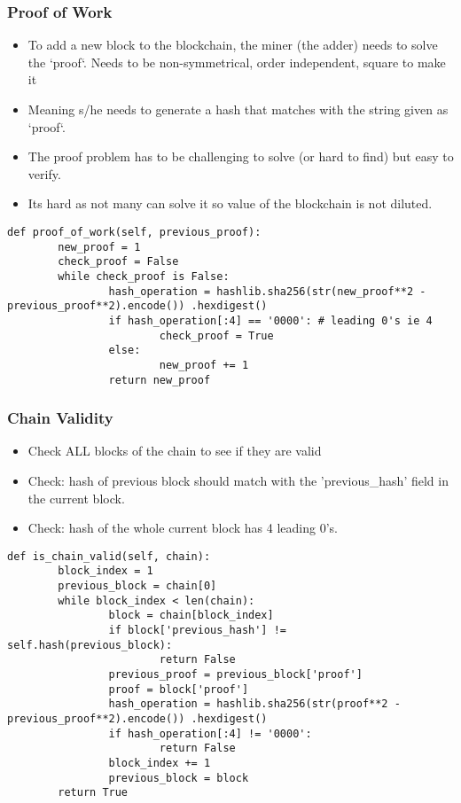 \begin{frame}[fragile]\frametitle{Proof of Work}
\begin{itemize}
\item To add a new block to the blockchain, the miner (the adder) needs to solve the `proof`. Needs to be non-symmetrical, order independent, square to make it 
\item Meaning s/he needs to generate a hash that matches with the string given as `proof`.
\item The proof problem has to be challenging to solve (or hard to find)  but easy to verify.
\item Its hard as not many can solve it so value of the blockchain is not diluted.

\end{itemize}

\begin{lstlisting}
def proof_of_work(self, previous_proof):
		new_proof = 1
		check_proof = False
		while check_proof is False:
				hash_operation = hashlib.sha256(str(new_proof**2 - previous_proof**2).encode()) .hexdigest()
				if hash_operation[:4] == '0000': # leading 0's ie 4
						check_proof = True
				else:
						new_proof += 1
				return new_proof
\end{lstlisting}
\end{frame}

\begin{frame}[fragile]\frametitle{Chain Validity}
\begin{itemize}
\item Check ALL blocks of the chain to see if they are valid
\item Check: hash of previous block should match with the 'previous\_hash' field in the current block.
\item Check: hash of the whole current block has 4 leading 0's.
\end{itemize}

\begin{lstlisting}
def is_chain_valid(self, chain):
		block_index = 1
		previous_block = chain[0]
		while block_index < len(chain):
				block = chain[block_index]
				if block['previous_hash'] != self.hash(previous_block):
						return False
				previous_proof = previous_block['proof']
				proof = block['proof']
				hash_operation = hashlib.sha256(str(proof**2 - previous_proof**2).encode()) .hexdigest()
				if hash_operation[:4] != '0000':
						return False
				block_index += 1
				previous_block = block
		return True
\end{lstlisting}
\end{frame}

